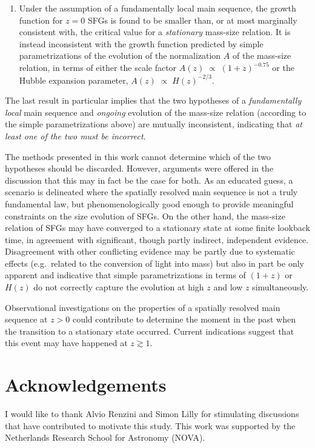 \documentclass[fleqn,usenatbib]{mnras}
\begin{document}
\begin{enumerate}
\item{Under the assumption of a fundamentally local main sequence, the growth function for $z=0$ SFGs is found to be smaller than, or at most marginally consistent with, the critical value for a \emph{stationary} mass-size relation. It is instead inconsistent with the growth function predicted by simple parametrizations of the evolution of the normalization $A$ of the mass-size relation, in terms of either the scale factor $A(z) \; \propto \; (1+z)^{-0.75}$ or the Hubble expansion parameter, $A(z) \; \propto \; H(z)^{-2/3}$.}
\end{enumerate}

The last result in particular implies that the two hypotheses of a \emph{fundamentally local} main sequence and \emph{ongoing} evolution of the mass-size relation (according to the simple parametrizations above) are mutually inconsistent, indicating that \emph{at least one of the two must be incorrect}.

The methods presented in this work cannot determine which of the two hypotheses should be discarded. However, arguments were offered in the discussion that this may in fact be the case for both.  As an educated guess, a scenario is delineated where the spatially resolved main sequence is not a truly fundamental law, but phenomenologically good enough to provide meaningful constraints on the size evolution of SFGs. On the other hand, the mass-size relation of SFGs may have converged to a stationary state at some finite lookback time, in agreement with significant, though partly indirect, independent evidence. Disagreement with other conflicting evidence may be partly due to systematic effects (e.g.\ related to the conversion of light into mass) but also in part be only apparent and indicative that simple parametrizations in terms of $(1+z)$ or $H(z)$ do not correctly capture the evolution at high $z$ and low $z$ simultaneously.

Observational investigations on the properties of a spatially resolved main sequence at $z > 0$ could contribute to determine the moment in the past when the transition to a stationary state occurred. Current indications suggest that this event may have happened at $z \gtrsim 1$.

\section*{Acknowledgements}
I would like to thank Alvio Renzini and Simon Lilly for stimulating discussions that have contributed to motivate this study. This work was supported by the Netherlands Research School for Astronomy (NOVA).
\end{document}
